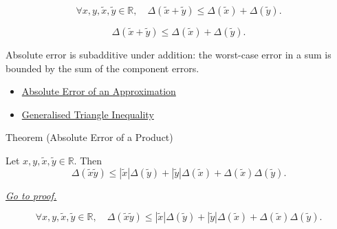 \begin{remark*}
\[
\forall x,y,\widetilde{x},\widetilde{y}\in\mathbb{R},\quad
\Delta(\widetilde{x}+\widetilde{y})
\leq \Delta(\widetilde{x})+\Delta(\widetilde{y}).
\]
\end{remark*}

\begin{remark*}
\[
\Delta(\widetilde{x}+\widetilde{y})\leq \Delta(\widetilde{x})+\Delta(\widetilde{y}).
\]
\end{remark*}

\begin{remark*}[Interpretation]
Absolute error is subadditive under addition: the worst-case error in a sum is bounded by the sum of the component errors.
\end{remark*}

\begin{dependencies}
\begin{itemize}
  \item \hyperref[def:absolute-error-approximation]{Absolute Error of an Approximation}
  \item \hyperref[thm:absolute-value-sum-bound]{Generalised Triangle Inequality}
\end{itemize}
\end{dependencies}

\begin{theorembox}{Theorem (Absolute Error of a Product)}
\begin{theorem}
\label{thm:absolute-error-product}
Let $x,y,\widetilde{x},\widetilde{y}\in\mathbb{R}$. Then
\[
  \Delta(\widetilde{x}\widetilde{y})
  \leq
  |\widetilde{x}|\Delta(\widetilde{y})
  +
  |\widetilde{y}|\Delta(\widetilde{x})
  +
  \Delta(\widetilde{x})\Delta(\widetilde{y}).
\]

\smallskip\noindent
\hyperref[prf:absolute-error-product]{\textit{Go to proof.}}
\end{theorem}
\end{theorembox}

\begin{remark*}
\[
\forall x,y,\widetilde{x},\widetilde{y}\in\mathbb{R},\quad
\Delta(\widetilde{x}\widetilde{y})
\leq |\widetilde{x}|\Delta(\widetilde{y})
+|\widetilde{y}|\Delta(\widetilde{x})
+\Delta(\widetilde{x})\Delta(\widetilde{y}).
\]
\end{remark*}

